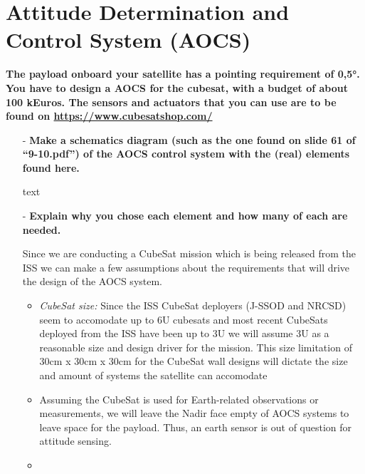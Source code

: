 \section{Attitude Determination and Control System (AOCS)}

\textbf{The payload onboard your satellite has a pointing requirement of 0,5°. You have to design a AOCS for the cubesat, with a budget of about 100 kEuros. The sensors and actuators that you can use are to be found on \url{https://www.cubesatshop.com/}}

\begin{itemize}
    \item[-] \textbf{Make a schematics diagram (such as the one found on slide 61 of “9-10.pdf”) of the AOCS control system with the (real) elements found here. } 

    text

    \item[-] \textbf{Explain why you chose each element and how many of each are needed. }

    Since we are conducting a CubeSat mission which is being released from the ISS we can make a few assumptions about the requirements that will drive the design of the AOCS system.
    \begin{itemize}
        \item \textit{CubeSat size:} Since the ISS CubeSat deployers (J-SSOD and NRCSD) seem to accomodate up to 6U \cite{deployers_wiki} cubesats and most recent CubeSats deployed from the ISS have been up to 3U we will assume 3U as a reasonable size and design driver for the mission.
        This size limitation of 30cm x 30cm x 30cm for the CubeSat wall designs will dictate the size and amount of systems the satellite can accomodate

        \item Assuming the CubeSat is used for Earth-related observations or measurements, we will leave the Nadir face empty of AOCS systems to leave space for the payload.
        Thus, an earth sensor is out of question for attitude sensing.

        \item 
    \end{itemize}
    
\end{itemize}

